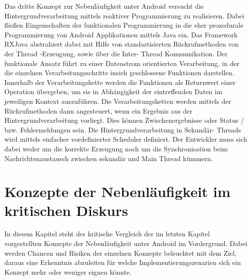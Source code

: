 \documentclass[12pt,oneside,a4paper,bibtotoc,liststotoc]{scrreprt}
\begin{document}
Das dritte Konzept zur Nebenläufigkeit unter Android versucht die Hintergrundverarbeitung mittels reaktiver Programmierung zu realisieren. Dabei fließen Eingenschaften der funktionalen Programmierung in die eher prozedurale Programmierung von Android Applikationen mittels Java ein. Das Framework RXJava abstrahiert dabei mit Hilfe von standartisierten Rückrufmethoden von der Thread -Erzeugung, sowie über die Inter- Thread Kommunikation. Der funktionale Ansatz führt zu einer Datenstrom orientierten Verarbeitung, in der die einzelnen Verarbeitungsschritte insich geschlossene Funktionen darstellen. Innerhalb der Verarbeitungskette werden die Funktionen als Returnwert einer Operation übergeben, um sie in Abhängigkeit der eintreffenden Daten im jeweiligen Kontext auszuführen.  Die Verarbeitungsketten werden mittels der Rückrufmethoden dann angesteuert, wenn ein Ergebnis aus der Hintergrundverarbeitung vorliegt. Dies können Zwischenergebnisse oder Status / bzw. Fehlermeldungen sein.
Die Hintergrundverarbeitung in Sekundär- Threads wird mittels einfacher vordefinierter Scheduler definiert. Der Entwickler muss sich dabei weder um die korrekte Erzeugung noch um die Synchronisation beim Nachrichtenaustausch zwischen sekundär und Main Thread kümmern. \newline

\chapter{Konzepte der Nebenläufigkeit im kritischen Diskurs}
In diesem Kapitel steht der kritische Vergleich der im letzten Kapitel vorgestellten Konzepte der Nebenläufigkeit unter Android im Vordergrund. Dabei werden Chancen und Risiken der einzelnen Konzepte beleuchtet mit dem Ziel, daraus eine Erkenntnis abzuleiten für welche Implementierungszenarien sich ein Konzept mehr oder weniger eignen könnte.
\end{document}
